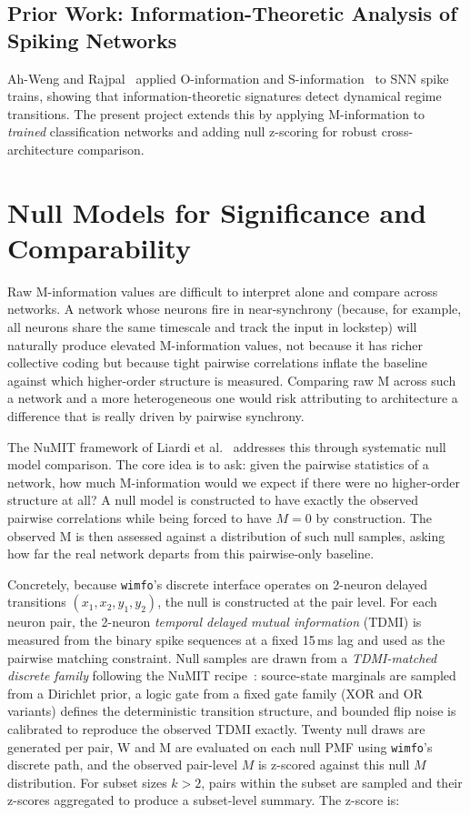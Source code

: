 \documentclass[12pt,twoside]{report}
\begin{document}
\subsection{Prior Work: Information-Theoretic Analysis of Spiking Networks}

Ah-Weng and Rajpal~\cite{ahweng} applied O-information and S-information~\cite{rosas2019}
to SNN spike trains, showing that information-theoretic signatures detect dynamical
regime transitions. The present project extends this by applying M-information to
\emph{trained} classification networks and adding null z-scoring for robust
cross-architecture comparison.


\section{Null Models for Significance and Comparability}
\label{sec:null}

Raw M-information values are difficult to interpret alone and compare across 
networks. A network whose neurons fire in near-synchrony (because, for example, all
neurons share the same timescale and track the input in lockstep) will naturally 
produce elevated M-information values, not because it has richer collective coding but 
because tight pairwise correlations inflate the baseline against which higher-order 
structure is measured. Comparing raw M across such a network and a more heterogeneous 
one would risk attributing to architecture a difference that is really driven by 
pairwise synchrony.

The NuMIT framework of Liardi et al.~\cite{liarinull} addresses this through systematic 
null model comparison. The core idea is to ask: given the pairwise statistics of a 
network, how much M-information would we expect if there were no higher-order structure 
at all? A null model is constructed to have exactly the observed pairwise correlations 
while being forced to have $M = 0$ by construction. The observed M is then assessed 
against a distribution of such null samples, asking how far the real network departs 
from this pairwise-only baseline.

Concretely, because \texttt{wimfo}'s discrete interface operates on 2-neuron delayed
transitions $(x_1, x_2, y_1, y_2)$, the null is constructed at the pair level.
For each neuron pair, the 2-neuron \emph{temporal delayed mutual information}
(TDMI) is measured from the binary spike sequences at a fixed 15\,ms lag and used
as the pairwise matching constraint. Null samples are drawn from a
\emph{TDMI-matched discrete family} following the NuMIT recipe~\cite{liarinull}:
source-state marginals are sampled from a Dirichlet prior, a logic gate from a
fixed gate family (XOR and OR variants) defines the deterministic transition
structure, and bounded flip noise is calibrated to reproduce the observed TDMI
exactly. Twenty null draws are generated per pair, W and M are evaluated on each
null PMF using \texttt{wimfo}'s discrete path, and the observed pair-level $M$ is
z-scored against this null $M$ distribution. For subset sizes $k > 2$, pairs
within the subset are sampled and their z-scores aggregated to produce a
subset-level summary. The z-score is:
\end{document}
